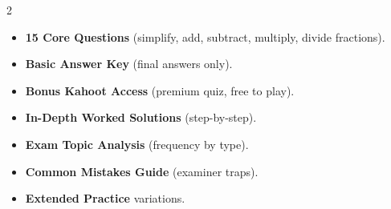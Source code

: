 \documentclass[11pt,a4paper]{article}
\newcommand{\FullReleaseDate}{April 30, 2026}
\begin{document}
\vspace{8pt}

\begin{multicols}{2}
  \begin{tcolorbox}[card, title=\sffamily\bfseries\textcolor{white}{\faHandPointDown\ TODAY (Simplified Version)}, colbacktitle=mainblue, boxed title style={sharp corners, boxrule=0pt}]
    \begin{itemize}[leftmargin=1.2em, itemsep=2pt]
      \item \small \textbf{15 Core Questions} (simplify, add, subtract, multiply, divide fractions).
      \item \small \textbf{Basic Answer Key} (final answers only).
      \item \small \textbf{Bonus Kahoot Access} (premium quiz, free to play).
    \end{itemize}
  \end{tcolorbox}

  \columnbreak

  \begin{tcolorbox}[card, title=\sffamily\bfseries\textcolor{white}{\faRocket\ ON \FullReleaseDate\ (Full Upgrade)}, colbacktitle=mainblue, boxed title style={sharp corners, boxrule=0pt}]
    \begin{itemize}[leftmargin=1.2em, itemsep=2pt]
      \item \small \textbf{In-Depth Worked Solutions} (step-by-step).
      \item \small \textbf{Exam Topic Analysis} (frequency by type).
      \item \small \textbf{Common Mistakes Guide} (examiner traps).
      \item \small \textbf{Extended Practice} variations.
    \end{itemize}
  \end{tcolorbox}
\end{multicols}
\end{document}
